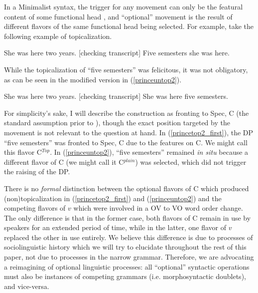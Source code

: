 In a Minimalist syntax, the trigger for any movement can only be the featural content of some functional head \citep{chomsky2000, chomsky2001}, and ``optional'' movement is the result of different flavors of the same functional head being selected.
For example, take the following example of topicalization.
\begin{exe}
\ex \label{princetop2_first} She was here two years.
[checking transcript] Five semesters she was here.\\
\citep[][8,9]{prince1999}
\end{exe}
While the topicalization of ``five semesters'' was felicitous, it was not obligatory, as can be seen in the modified version in (\ref{princeuntop2}).
\begin{exe}
\ex \label{princeuntop2} She was here two years.
[checking transcript] She was here five semesters.\\
\citep[Modified from][8,9]{prince1999}
\end{exe}
For simplicity's sake, I will describe the construction as fronting to Spec, C (the standard assumption prior to \citealt{rizzi1997}), though the exact position targeted by the movement is not relevant to the question at hand.
In (\ref{princetop2_first}), the DP ``five semesters'' was fronted to Spec, C due to the features on C.
We might call this flavor C$^{Top}$.
In (\ref{princeuntop2}), ``five semesters'' remained \textsl{in situ} because a different flavor of C (we might call it C$^{plain}$) was selected, which did not trigger the raising of the DP.

There is no \emph{formal} distinction between the optional flavors of C which produced (non)topicalization in (\ref{princetop2_first}) and (\ref{princeuntop2}) and the competing flavors of $v$ which were involved in a OV to VO word order change.
The only difference is that in the former case, both flavors of C remain in use by speakers for an extended period of time, while in the latter, one flavor of $v$ replaced the other in use entirely.
We believe this difference is due to processes of sociolinguistic history which we will try to elucidate throughout the rest of this paper, not due to processes in the narrow grammar.
Therefore, we are advocating a reimagining of optional linguistic processes: all ``optional'' syntactic operations must also be instances of competing grammars (i.e. morphosyntactic doublets), and vice-versa.

